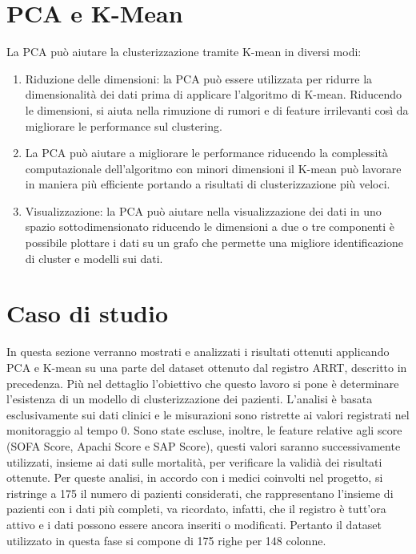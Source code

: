 \section{PCA e K-Mean}
La PCA può aiutare la clusterizzazione tramite K-mean in diversi modi:
\begin{enumerate}
	\item Riduzione delle dimensioni: la PCA può essere utilizzata per ridurre la dimensionalità dei dati prima di applicare l'algoritmo di K-mean. Riducendo le dimensioni, si aiuta nella rimuzione di rumori e di feature irrilevanti così da migliorare le performance sul clustering.
	\item La PCA può aiutare a migliorare le performance riducendo la complessità computazionale dell'algoritmo con minori dimensioni il K-mean può lavorare in maniera più efficiente portando a risultati di clusterizzazione più veloci.
	\item Visualizzazione: la PCA può aiutare nella visualizzazione dei dati in uno spazio sottodimensionato riducendo le dimensioni a due o tre componenti è possibile plottare i dati su un grafo che permette una migliore identificazione di cluster e modelli sui dati.
	
\end{enumerate}

\section{Caso di studio}

In questa sezione verranno mostrati e analizzati i risultati ottenuti applicando PCA e K-mean su una parte del dataset ottenuto dal registro ARRT, descritto in precedenza.
Più nel dettaglio l'obiettivo che questo lavoro si pone è determinare l'esistenza di un modello di clusterizzazione dei pazienti. L'analisi è basata esclusivamente sui dati clinici e  le misurazioni sono ristrette ai valori registrati nel monitoraggio al tempo 0. Sono state escluse, inoltre, le feature relative agli score (SOFA Score, Apachi Score e SAP Score), questi valori saranno successivamente utilizzati, insieme ai dati sulle mortalità, per verificare la validià dei risultati ottenute. Per queste analisi, in accordo con i medici coinvolti nel progetto, si ristringe a 175 il numero di pazienti considerati, che rappresentano l'insieme di pazienti con i dati più completi, va ricordato, infatti, che il registro è tutt'ora attivo e i dati possono essere ancora inseriti o modificati. Pertanto il dataset utilizzato in questa fase si compone di 175 righe per 148 colonne.

